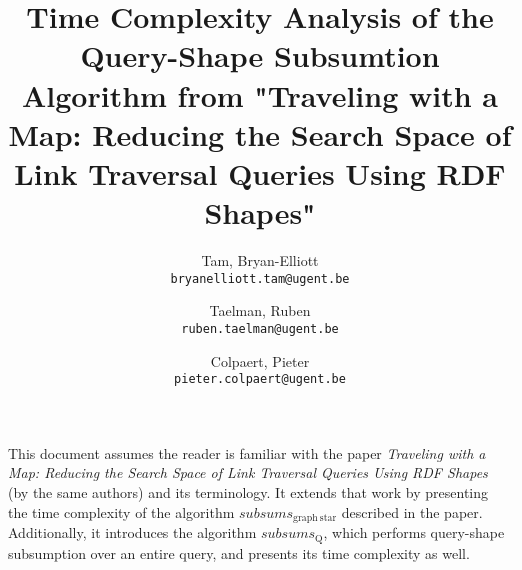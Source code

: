 \documentclass{article}
\title{Time Complexity Analysis of the Query-Shape Subsumtion Algorithm from "Traveling with a Map: Reducing the Search Space of Link Traversal Queries Using RDF Shapes"}
\author{Tam, Bryan-Elliott \\
    \texttt{bryanelliott.tam@ugent.be}
    \and 
    Taelman, Ruben \\
    \texttt{ruben.taelman@ugent.be}
    \and
    Colpaert, Pieter \\
    \texttt{pieter.colpaert@ugent.be}
}
\begin{document}
\maketitle

This document assumes the reader is familiar with the paper \textit{Traveling with a Map: Reducing the Search Space of Link Traversal Queries Using RDF Shapes} (by the same authors) and its terminology.
It extends that work by presenting the time complexity of the algorithm $subsums_{\mathrm{graph\ star}}$ described in the paper.
Additionally, it introduces the algorithm $subsums_{\mathrm{Q}}$, which performs query-shape subsumption over an entire query, and presents its time complexity as well.


\end{document}
